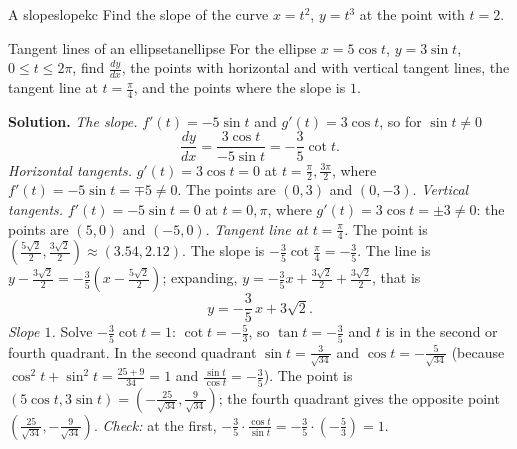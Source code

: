 \documentclass[11pt]{article}
\begin{document}
\begin{kc}{A slope}{slopekc}
Find the slope of the curve $x=t^2$, $y=t^3$ at the point with $t=2$.
\end{kc}

\begin{exmp}{Tangent lines of an ellipse}{tanellipse}
For the ellipse $x=5\cos t$, $y=3\sin t$, $0\le t\le2\pi$, find $\frac{dy}{dx}$, the points with horizontal and with vertical tangent lines, the tangent line at $t=\frac\pi4$, and the points where the slope is $1$.

\textbf{Solution.} \emph{The slope.} $f'(t)=-5\sin t$ and $g'(t)=3\cos t$, so for $\sin t\ne0$
\[
\frac{dy}{dx}=\frac{3\cos t}{-5\sin t}=-\frac35\cot t.
\]
\emph{Horizontal tangents.} $g'(t)=3\cos t=0$ at $t=\frac\pi2,\frac{3\pi}2$, where $f'(t)=-5\sin t=\mp5\ne0$. The points are $(0,3)$ and $(0,-3)$. \emph{Vertical tangents.} $f'(t)=-5\sin t=0$ at $t=0,\pi$, where $g'(t)=3\cos t=\pm3\ne0$: the points are $(5,0)$ and $(-5,0)$.
\emph{Tangent line at $t=\frac\pi4$.} The point is $\left(\frac{5\sqrt2}2,\frac{3\sqrt2}2\right)\approx(3.54,2.12)$. The slope is $-\frac35\cot\frac\pi4=-\frac35$. The line is $y-\frac{3\sqrt2}2=-\frac35\left(x-\frac{5\sqrt2}2\right)$; expanding, $y=-\frac35x+\frac{3\sqrt2}2+\frac{3\sqrt2}2$, that is
\[
y=-\frac35\,x+3\sqrt2.
\]
\emph{Slope $1$.} Solve $-\frac35\cot t=1$: $\cot t=-\frac53$, so $\tan t=-\frac35$ and $t$ is in the second or fourth quadrant. In the second quadrant $\sin t=\frac3{\sqrt{34}}$ and $\cos t=-\frac5{\sqrt{34}}$ (because $\cos^2t+\sin^2t=\frac{25+9}{34}=1$ and $\frac{\sin t}{\cos t}=-\frac35$). The point is $\left(5\cos t,3\sin t\right)=\left(-\frac{25}{\sqrt{34}},\frac9{\sqrt{34}}\right)$; the fourth quadrant gives the opposite point $\left(\frac{25}{\sqrt{34}},-\frac9{\sqrt{34}}\right)$. \emph{Check:} at the first, $-\frac35\cdot\frac{\cos t}{\sin t}=-\frac35\cdot\left(-\frac53\right)=1$.
\end{exmp}
\end{document}
